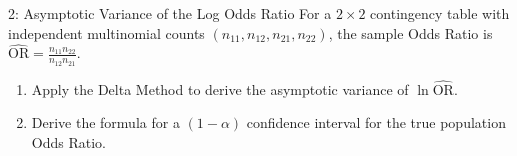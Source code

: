 \documentclass[12pt, a4paper]{article}
\newif\ifsolutions
\begin{document}
\ifsolutions
\begin{solutionbox}
\textbf{Part (a):} Expanding $M_X(t) = \mathbb{E}[1 + tX + \frac{t^2 X^2}{2} + o(t^2)]$:
Since $\mathbb{E}[X] = 0$ and $\mathbb{E}[X^2] = 1$, we obtain:
\begin{equation*}
    M_X(t) = 1 + \frac{t^2}{2} + o(t^2)
\end{equation*}

\textbf{Part (b):} By independence of $X_i$:
\begin{equation*}
    M_{Z_n}(t) = \mathbb{E}\left[\exp\left(\frac{t}{\sqrt{n}} \sum_{i=1}^n X_i\right)\right] = \prod_{i=1}^n M_X\left(\frac{t}{\sqrt{n}}\right) = \left[ M_X\left(\frac{t}{\sqrt{n}}\right) \right]^n
\end{equation*}

\textbf{Part (c):} Substituting the Taylor expansion:
\begin{equation*}
    M_{Z_n}(t) = \left[ 1 + \frac{t^2}{2n} + o\left(\frac{t^2}{n}\right) \right]^n
\end{equation*}
Using the fundamental limit $\lim_{n \to \infty} (1 + \frac{a}{n})^n = e^a$, we set $a = t^2/2$:
\begin{equation*}
    \lim_{n \to \infty} M_{Z_n}(t) = \exp\left(\frac{t^2}{2}\right)
\end{equation*}
Since $e^{t^2/2}$ is the moment generating function of a standard normal distribution $\mathcal{N}(0, 1)$, by the Continuity Theorem for MGFs, $Z_n \xrightarrow{d} \mathcal{N}(0, 1)$. \hfill $\blacksquare$
\end{solutionbox}
\fi

\begin{problembox}[50 Points]{2: Asymptotic Variance of the Log Odds Ratio}
For a $2 \times 2$ contingency table with independent multinomial counts $(n_{11}, n_{12}, n_{21}, n_{22})$, the sample Odds Ratio is $\widehat{\mathrm{OR}} = \frac{n_{11} n_{22}}{n_{12} n_{21}}$.
\begin{enumerate}[label=(\alph*)]
    \item Apply the Delta Method to derive the asymptotic variance of $\ln \widehat{\mathrm{OR}}$.
    \item Derive the formula for a $(1-\alpha)$ confidence interval for the true population Odds Ratio.
\end{enumerate}
\end{problembox}
\end{document}
